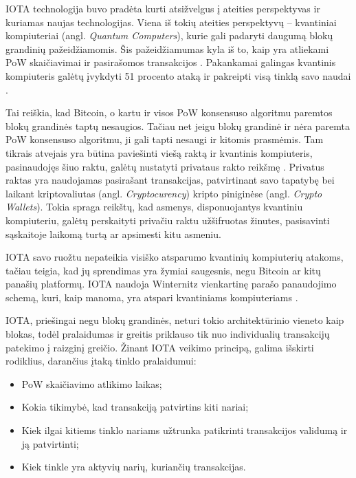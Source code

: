 IOTA technologija buvo pradėta kurti atsižvelgus į ateities perspektyvas ir kuriamas naujas technologijas. Viena iš tokių ateities perspektyvų – kvantiniai kompiuteriai (angl. \textit{Quantum Computers}), kurie gali padaryti daugumą blokų grandinių pažeidžiamomis. Šis pažeidžiamumas kyla iš to, kaip yra atliekami PoW skaičiavimai ir pasirašomos transakcijos \cite{kiktenko2018quantum}. Pakankamai galingas kvantinis kompiuteris galėtų įvykdyti 51 procento ataką ir pakreipti visą tinklą savo naudai \cite{kiktenko2018quantum}. 

Tai reiškia, kad Bitcoin, o kartu ir visos PoW konsensuso algoritmu paremtos blokų grandinės taptų nesaugios. Tačiau net jeigu blokų grandinė ir nėra paremta PoW konsensuso algoritmu, ji gali tapti nesaugi ir kitomis prasmėmis. Tam tikrais atvejais yra būtina paviešinti viešą raktą ir kvantinis kompiuteris, pasinaudojęs šiuo raktu, galėtų nustatyti privataus rakto reikšmę \cite{aggarwal2017quantum}. Privatus raktas yra naudojamas pasirašant transakcijas, patvirtinant savo tapatybę bei laikant kriptovaliutas (angl. \textit{Cryptocurency}) kripto piniginėse (angl. \textit{Crypto Wallets}). Tokia spraga reikštų, kad asmenys, disponuojantys kvantiniu kompiuteriu, galėtų perskaityti privačiu raktu užšifruotas žinutes, pasisavinti sąskaitoje laikomą turtą ar apsimesti kitu asmeniu.

IOTA savo ruožtu nepateikia visiško atsparumo kvantinių kompiuterių atakoms, tačiau teigia, kad jų sprendimas yra žymiai saugesnis, negu Bitcoin ar kitų panašių platformų. IOTA naudoja Winternitz vienkartinę parašo panaudojimo schemą, kuri, kaip manoma, yra atspari kvantiniams kompiuteriams \cite{el2018review}.





IOTA, priešingai negu blokų grandinės, neturi tokio architektūrinio vieneto kaip blokas, todėl pralaidumas ir greitis priklauso tik nuo individualių transakcijų patekimo į raizginį greičio. Žinant IOTA veikimo principą, galima išskirti rodiklius, darančius įtaką tinklo pralaidumui:
\begin{itemize}
    \item PoW skaičiavimo atlikimo laikas;
    \item Kokia tikimybė, kad transakciją patvirtins kiti nariai;
    \item Kiek ilgai kitiems tinklo nariams užtrunka patikrinti transakcijos validumą ir ją patvirtinti;
    \item Kiek tinkle yra aktyvių narių, kuriančių transakcijas.
\end{itemize}


